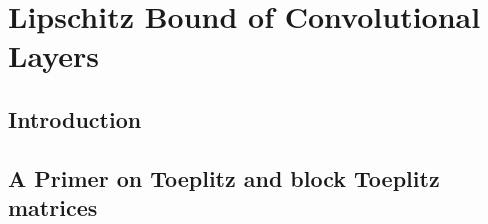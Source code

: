 \chapter{Lipschitz Bound of Convolutional Layers}
\label{chapter:ch5-lipschitz_bound}
\localtoc



\section{Introduction}
\label{section:ch5-introduction}

\section{A Primer on Toeplitz and block Toeplitz matrices}
\label{section:primer_toeplitz_matrix}

